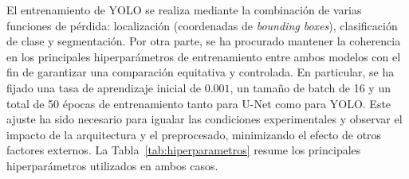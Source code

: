 \documentclass[../main.tex]{subfiles}
\begin{document}

El entrenamiento de YOLO se realiza mediante la combinación de varias funciones de pérdida: localización (coordenadas de \textit{bounding boxes}), clasificación de clase y segmentación. Por otra parte, se ha procurado mantener la coherencia en los principales hiperparámetros de entrenamiento entre ambos modelos con el fin de garantizar una comparación equitativa y controlada. En particular, se ha fijado una tasa de aprendizaje inicial de $0.001$, un tamaño de batch de 16 y un total de 50 épocas de entrenamiento tanto para U-Net como para YOLO. Este ajuste ha sido necesario para igualar las condiciones experimentales y observar el impacto de la arquitectura y el preprocesado, minimizando el efecto de otros factores externos.
La Tabla~\ref{tab:hiperparametros} resume los principales hiperparámetros utilizados en ambos casos.
\end{document}

